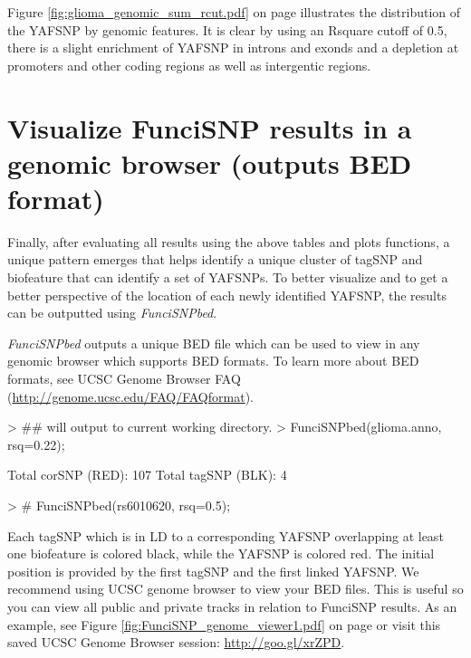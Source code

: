 \documentclass[12pt,fullpage]{article}
\newcommand{\Rmethod}[1]{{\textit{#1}}}
\begin{document}
Figure \ref{fig:glioma_genomic_sum_rcut.pdf} on page                             
\pageref{fig:glioma_genomic_sum_rcut.pdf} illustrates the distribution of the       
YAFSNP by genomic features. It is clear by using an Rsquare cutoff of 0.5,   
        there is a slight enrichment of YAFSNP in introns and exonds and a          
            depletion at promoters and other coding regions as well as
            intergentic       
                regions.

\newpage


\section{Visualize FunciSNP results in a genomic browser (outputs BED format)}

Finally, after evaluating all results using the above tables and plots
functions, a unique pattern emerges that helps identify a unique cluster of
tagSNP and biofeature that can identify a set of YAFSNPs. To better
visualize and to get a better perspective of the location of each newly
identified YAFSNP, the results can be outputted using \Rmethod{FunciSNPbed}.

\Rmethod{FunciSNPbed} outputs a unique BED file which can be used to view in any
genomic browser which supports BED formats. To learn more about BED formats, see
UCSC Genome Browser FAQ (\url{http://genome.ucsc.edu/FAQ/FAQformat}). 

\begin{Schunk}
\begin{Sinput}
> ## will output to current working directory.
> FunciSNPbed(glioma.anno, rsq=0.22);
\end{Sinput}
\begin{Soutput}
Total corSNP (RED):  107 
Total tagSNP (BLK):  4 
\end{Soutput}
\begin{Sinput}
> # FunciSNPbed(rs6010620, rsq=0.5);
\end{Sinput}
\end{Schunk}

Each tagSNP which is in LD to a corresponding YAFSNP overlapping at least
one biofeature is colored black, while the YAFSNP is colored red. The
initial position is provided by the first tagSNP and the first linked
YAFSNP. We recommend using UCSC genome browser to view your BED files. This
is useful so you can view all public and private tracks in relation to FunciSNP
results. As an example, see Figure \ref{fig:FunciSNP_genome_viewer1.pdf} on page
\pageref{fig:FunciSNP_genome_viewer1.pdf} or visit this saved UCSC Genome
Browser session: \url{http://goo.gl/xrZPD}.
\end{document}
